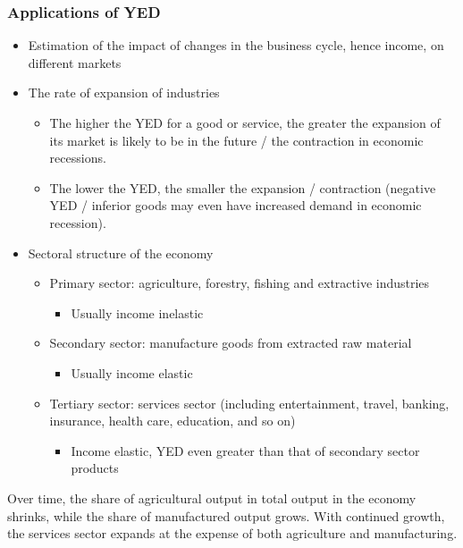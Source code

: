 \documentclass[a4paper,12pt]{article}
\begin{document}
\subsubsection*{Applications of YED}
\begin{itemize}
    \item Estimation of the impact of changes in the business cycle, hence income, on different markets
  \item The rate of expansion of industries
  \begin{itemize}
    \item The higher the YED for a good or service, the greater the expansion of its market is likely to be in the future / the contraction in economic recessions.
    \item The lower the YED, the smaller the expansion / contraction (negative YED / inferior goods may even have increased demand in economic recession).
  \end{itemize}
  \item Sectoral structure of the economy
  \begin{itemize}
      \item Primary sector: agriculture, forestry, fishing and extractive industries
      \begin{itemize}
        \item Usually income inelastic
      \end{itemize}
      \item Secondary sector: manufacture goods from extracted raw material
      \begin{itemize}
        \item Usually income elastic
      \end{itemize}
      \item Tertiary sector: services sector (including entertainment, travel, banking, insurance, health care, education, and so on)
      \begin{itemize}
        \item Income elastic, YED even greater than that of secondary sector products
      \end{itemize}
  \end{itemize}
\end{itemize}
Over time, the share of agricultural output in total output in the economy shrinks, while the share of manufactured output grows. With continued growth, the services sector expands at the expense of both agriculture and manufacturing.
\end{document}
